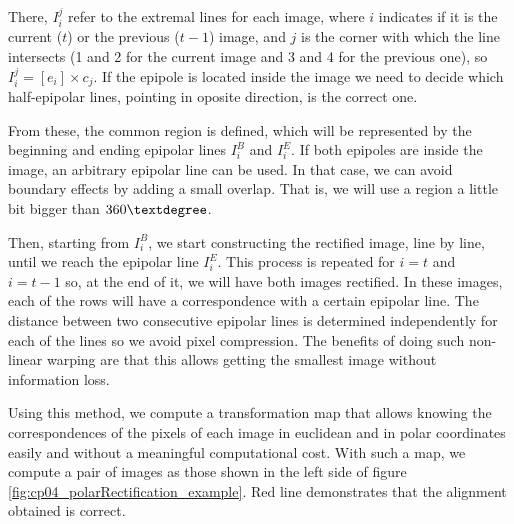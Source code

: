 There, $I_i^j$ refer to the extremal lines for each image, where $i$ indicates if it is the current ($t$) or the previous ($t - 1$) image, and $j$ is the corner with which the line intersects (1 and 2 for the current image and 3 and 4 for the previous one), so $I_i^j = [e_i] \times c_j$. If the epipole is located inside the image we need to decide which half-epipolar lines, pointing in oposite direction, is the correct one.



From these, the common region is defined, which will be represented by the beginning and ending epipolar lines $I_i^B$ and $I_i^E$. If both epipoles are inside the image, an arbitrary epipolar line can be used. In that case, we can avoid boundary effects by adding a small overlap. That is, we will use a region a little bit bigger than $360\textdegree$.

Then, starting from $I_i^B$, we start constructing the rectified image, line by line, until we reach the epipolar line $I_i^E$. This process is repeated for $i=t$ and $i=t-1$ so, at the end of it, we will have both images rectified. In these images, each of the rows will have a correspondence with a certain epipolar line. The distance between two consecutive epipolar lines is determined independently for each of the lines so we avoid pixel compression. The benefits of doing such non-linear warping are that this allows getting the smallest image without information loss.

Using this method, we compute a transformation map that allows knowing the correspondences of the pixels of each image in euclidean and in polar coordinates easily and without a meaningful computational cost. With such a map, we compute a pair of images as those shown in the left side of figure \ref{fig:cp04_polarRectification_example}. Red line demonstrates that the alignment obtained is correct. 
